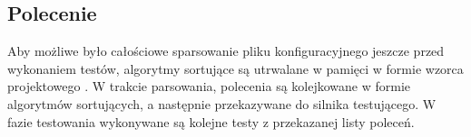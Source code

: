 \begin{figure}[H]
	\centering
	
\end{figure}

\subsection{Polecenie}
Aby możliwe było całościowe sparsowanie pliku konfiguracyjnego jeszcze przed wykonaniem testów, algorytmy sortujące są utrwalane w pamięci w formie wzorca projektowego . W trakcie parsowania, polecenia są kolejkowane w formie algorytmów sortujących, a następnie przekazywane do silnika testującego. W fazie testowania wykonywane są kolejne testy z przekazanej listy poleceń.

\begin{figure}[H]
	\centering
	
\end{figure}


